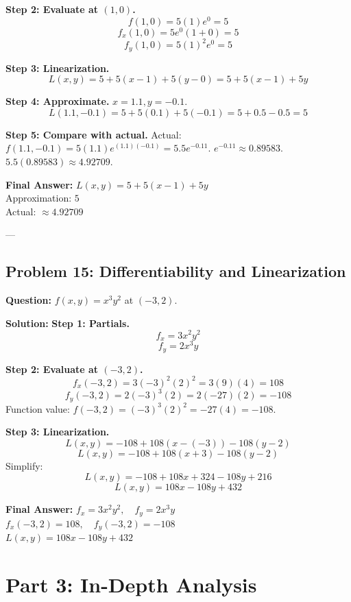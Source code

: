 \documentclass{article}
\begin{document}
\textbf{Step 2: Evaluate at $(1, 0)$.}
\[ f(1, 0) = 5(1)e^0 = 5 \]
\[ f_x(1, 0) = 5e^0(1 + 0) = 5 \]
\[ f_y(1, 0) = 5(1)^2 e^0 = 5 \]

\textbf{Step 3: Linearization.}
\[ L(x, y) = 5 + 5(x - 1) + 5(y - 0) = 5 + 5(x - 1) + 5y \]

\textbf{Step 4: Approximate.}
$x = 1.1, y = -0.1$.
\[ L(1.1, -0.1) = 5 + 5(0.1) + 5(-0.1) = 5 + 0.5 - 0.5 = 5 \]

\textbf{Step 5: Compare with actual.}
Actual: $f(1.1, -0.1) = 5(1.1)e^{(1.1)(-0.1)} = 5.5 e^{-0.11}$.
$e^{-0.11} \approx 0.89583$.
$5.5(0.89583) \approx 4.92709$.

\textbf{Final Answer:}
$L(x,y) = 5 + 5(x-1) + 5y$ \\
Approximation: $5$ \\
Actual: $\approx 4.92709$

---

\subsection*{Problem 15: Differentiability and Linearization}
\textbf{Question:} $f(x, y) = x^3 y^2$ at $(-3, 2)$.

\textbf{Solution:}
\textbf{Step 1: Partials.}
\[ f_x = 3x^2 y^2 \]
\[ f_y = 2x^3 y \]

\textbf{Step 2: Evaluate at $(-3, 2)$.}
\[ f_x(-3, 2) = 3(-3)^2 (2)^2 = 3(9)(4) = 108 \]
\[ f_y(-3, 2) = 2(-3)^3 (2) = 2(-27)(2) = -108 \]
Function value: $f(-3, 2) = (-3)^3 (2)^2 = -27(4) = -108$.

\textbf{Step 3: Linearization.}
\[ L(x, y) = -108 + 108(x - (-3)) - 108(y - 2) \]
\[ L(x, y) = -108 + 108(x + 3) - 108(y - 2) \]
Simplify:
\[ L(x, y) = -108 + 108x + 324 - 108y + 216 \]
\[ L(x, y) = 108x - 108y + 432 \]

\textbf{Final Answer:}
$f_x = 3x^2 y^2, \quad f_y = 2x^3 y$ \\
$f_x(-3, 2) = 108, \quad f_y(-3, 2) = -108$ \\
$L(x, y) = 108x - 108y + 432$

\newpage
\section{Part 3: In-Depth Analysis}
\end{document}
